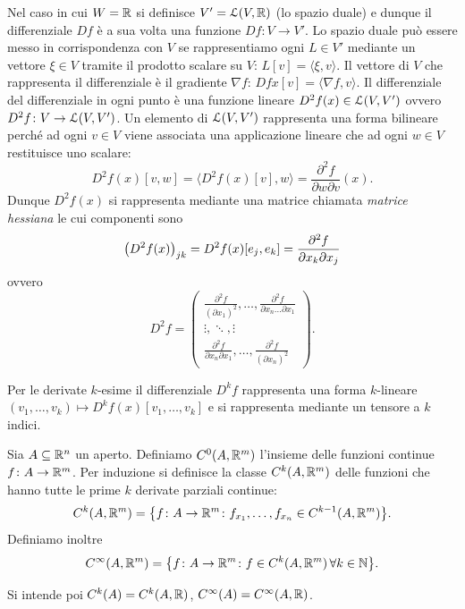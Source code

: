 Nel caso in cui $W = {\mathbb R}$ si definisce $V ' = \mathcal L(V,{\mathbb R})$ (lo spazio duale) 
e dunque il differenziale $Df$ è a sua volta una funzione $Df\colon V \to V'$. 
Lo spazio duale può essere messo in corrispondenza con $V$ se 
rappresentiamo ogni $L \in V'$ mediante un vettore $\xi \in V$ 
tramite il prodotto scalare su $V$: $L[v] = \langle \xi, v\rangle$.
Il vettore di $V$ che rappresenta il differenziale è il gradiente $\nabla f$:
$Df{x}[v] = \langle \nabla f, v\rangle$.
Il differenziale del differenziale in ogni punto è una funzione lineare $D^2 f(x)\in \mathcal L(V,V')$
ovvero $D^2 f \colon V \to \mathcal L(V,V')$. 
Un elemento di $\mathcal L(V,V')$ rappresenta una forma bilineare 
perché ad ogni $v \in V$ viene associata una applicazione lineare 
che ad ogni $w\in V$ restituisce uno scalare:
\[
  D^2 f(x)[v,w] 
  = \langle D^2 f(x)[v], w\rangle
  = \frac{\partial^2 f}{\partial w \partial v}(x).
\]
Dunque $D^2f(x)$ si rappresenta mediante una matrice 
chiamata \emph{matrice hessiana} le cui componenti 
sono
\[
  {\left( D^2 f(x) \right)}_{jk}
  = D^2 f(x)[e_j,e_k] = \frac{\partial^2 f}{\partial x_k \partial x_j}
\]
ovvero
\[
  D^2 f = \begin{pmatrix}
    \frac{\partial^2 f}{(\partial x_1)^2}, \dots, \frac{\partial^2 f}{\partial x_n \dots \partial x_1} \\
    \vdots, \ddots, \vdots \\
    \frac{\partial^2 f}{\partial x_n \partial x_1}, \dots, \frac{\partial^2 f}{(\partial x_n)^2}
  \end{pmatrix}.
\]

Per le derivate $k$-esime il differenziale $D^k f$ rappresenta
una forma $k$-lineare $(v_1, \dots, v_k) \mapsto D^k f(x)[v_1, \dots, v_k]$
e si rappresenta mediante un tensore a $k$ indici.

\begin{definition}
Sia $A\subseteq {\mathbb R}^n$ un aperto. 
Definiamo $C^0(A,{\mathbb R}^m)$ l'insieme delle funzioni continue
$ f\colon A \to {\mathbb R}^m$. 
Per induzione si definisce la classe $C^k(A,{\mathbb R}^m)$ 
delle funzioni che hanno tutte le prime $k$ derivate parziali 
continue:
\[
   C^k(A,{\mathbb R}^m) = {\left\{  f\colon A\to{\mathbb R}^m\colon
      f_{x_1}, \dots,  f_{x_n} \in C^{k-1}(A,{\mathbb R}^m)
    \right\}}.
\]
Definiamo inoltre
\[
  C^\infty(A, {\mathbb R}^m) = {\left\{  f\colon A\to {\mathbb R}^m\colon 
  f\in C^k(A,{\mathbb R}^m)\,\forall k\in {\mathbb N} \right\}}.
\]

Si intende poi $C^k(A) = C^k(A,{\mathbb R})$, $C^\infty(A) = C^\infty(A,{\mathbb R})$.
\end{definition}

